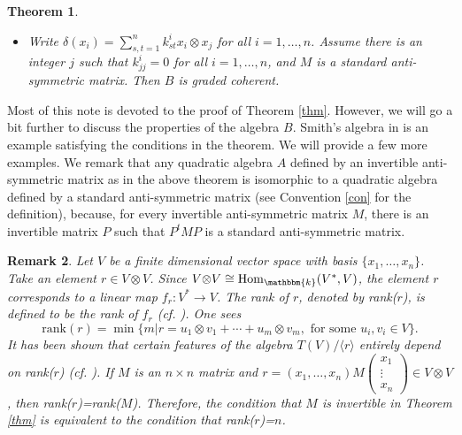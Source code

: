 \documentclass[a4paper]{amsart}
\newtheorem{thm}{Theorem}[section]
\newtheorem{rem}[thm]{Remark}
\begin{document}
\begin{thm}
\begin{itemize}
\item[(iii)] Write $\delta(x_i)=\sum_{s,t=1}^nk^i_{st}x_i{\otimes} x_j$ for all $i=1,\dots,n$. Assume there is an integer $j$ such that $k^i_{jj}=0$ for all $i=1,\dots,n$, and $M$ is a standard anti-symmetric matrix. Then $B$ is graded coherent.
\end{itemize}
\end{thm}

Most of this note is devoted to the proof of Theorem \ref{thm}. However, we will go a bit further to discuss the properties of the algebra $B$. Smith's algebra in \cite{Sm} is an example satisfying the conditions in the theorem. We will provide a few more examples. We remark that any quadratic algebra $A$ defined by an invertible anti-symmetric matrix as in the above theorem is isomorphic to a quadratic algebra defined by a standard anti-symmetric matrix (see Convention \ref{con} for the definition), because, for every invertible anti-symmetric matrix $M$, there is an invertible matrix $P$ such that $P^tMP$ is a standard anti-symmetric matrix.

\begin{rem}\label{rrem}{\rm Let $V$ be a finite dimensional vector space with basis $\{x_1,\dots,x_n\}$. Take an element $r\in V{\otimes} V$. Since $V{\otimes} V\cong {\operatorname {Hom}}_{\mathbbm{k}}(V^*,V)$, the element $r$ corresponds to a linear map $f_r:V^*\to V$. The {\it rank} of $r$, denoted by rank($r$), is defined to be the rank of $f_r$ (cf. \cite[Introduction]{Z2}). One sees $$\text{rank}(r)=\min\{m|r=u_1{\otimes} v_1+\cdots+u_m{\otimes} v_m, \text{ for some }u_i,v_i\in V\}.$$ It has been shown that certain features of the algebra $T(V)/\langle r\rangle$ entirely depend on rank($r$) (cf. \cite[Theorem 0.1]{Z2}). If $M$ is an $n\times  n$ matrix and $r=(x_1,\dots,x_n)M\left(
                                                                          \begin{array}{c}
                                                                            x_1 \\
                                                                            \vdots \\
                                                                            x_n
                                                                          \end{array}
                                                                        \right)
\in V{\otimes} V$, then rank($r$)=rank($M$). Therefore, the condition that $M$ is invertible in Theorem \ref{thm} is equivalent to the condition that rank($r$)=$n$. }
\end{rem}
\end{document}
